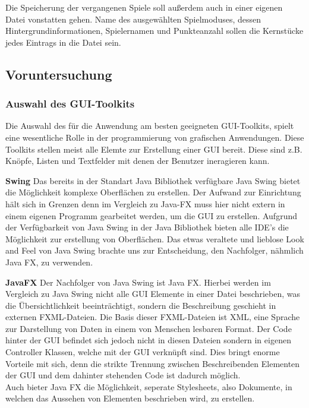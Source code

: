 Die Speicherung der vergangenen Spiele soll außerdem auch in einer eigenen Datei vonstatten gehen. Name des ausgewählten Spielmoduses, dessen Hintergrundinformationen, Spielernamen und Punkteanzahl sollen die Kernstücke jedes Eintrags in die Datei sein.\newpage

\subsection{Voruntersuchung}\label{subsec:voruntersuchung}

\subsubsection{Auswahl des GUI-Toolkits}
Die Auswahl des für die Anwendung am besten geeigneten GUI-Toolkits, spielt eine wesentliche Rolle in der programmierung von grafischen Anwendungen. Diese Toolkits stellen meist alle Elemte zur Erstellung einer GUI bereit. Diese sind z.B. Knöpfe, Listen und Textfelder mit denen der Benutzer ineragieren kann.

\textbf{Swing}
Das bereits in der Standart Java Bibliothek verfügbare Java Swing bietet die Möglichkeit komplexe Oberflächen zu erstellen. Der Aufwand zur Einrichtung hält sich in Grenzen denn im Vergleich zu Java-FX muss hier nicht extern in einem eigenen Programm gearbeitet werden, um die GUI zu erstellen.
Aufgrund der Verfügbarkeit von Java Swing in der Java Bibliothek bieten alle IDE's die Möglichkeit zur erstellung von Oberflächen. Das etwas veraltete und lieblose Look and Feel von Java Swing brachte uns zur Entscheidung, den Nachfolger, nähmlich Java FX, zu verwenden.

\textbf{JavaFX}
Der Nachfolger von Java Swing ist Java FX. Hierbei werden im Vergleich zu Java Swing nicht alle GUI Elemente in einer Datei beschrieben, was die Übersichtlichkeit beeinträchtigt, sondern die Beschreibung geschieht in externen FXML-Dateien.
Die Basis dieser FXML-Dateien ist XML, eine Sprache zur Darstellung von Daten in einem von Menschen lesbaren Format. Der Code hinter der GUI befindet sich jedoch nicht in diesen Dateien sondern in eigenen Controller Klassen, welche mit der GUI verknüpft sind. Dies bringt enorme Vorteile mit sich, denn die strikte Trennung zwischen Beschreibenden Elementen der GUI
und dem dahinter stehenden Code ist dadurch möglich.\\
Auch bieter Java FX die Möglichkeit, seperate Stylesheets, also Dokumente, in welchen das Aussehen von Elementen beschrieben wird, zu erstellen.


